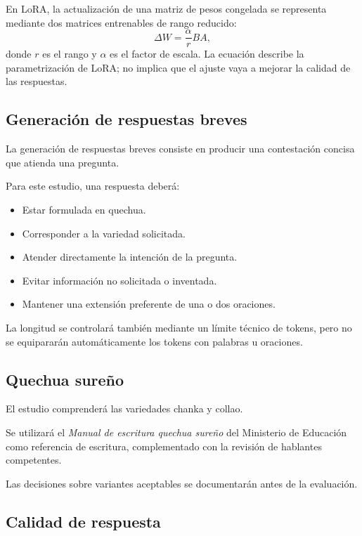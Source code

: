 En LoRA, la actualización de una matriz de pesos congelada se representa mediante dos matrices entrenables de rango reducido:
\begin{equation}
\Delta W=\frac{\alpha}{r}BA,
\label{eq:descomposicion_lora}
\end{equation}
donde $r$ es el rango y $\alpha$ es el factor de escala. La ecuación describe la parametrización de LoRA; no implica que el ajuste vaya a mejorar la calidad de las respuestas.

\subsection{Generación de respuestas breves}\label{generaciuxf3n-de-respuestas-breves}

La generación de respuestas breves consiste en producir una contestación concisa que atienda una pregunta.

Para este estudio, una respuesta deberá:

\begin{itemize}
\tightlist
\item
  Estar formulada en quechua.
\item
  Corresponder a la variedad solicitada.
\item
  Atender directamente la intención de la pregunta.
\item
  Evitar información no solicitada o inventada.
\item
  Mantener una extensión preferente de una o dos oraciones.
\end{itemize}

La longitud se controlará también mediante un límite técnico de tokens, pero no se equipararán automáticamente los tokens con palabras u oraciones.

\subsection{Quechua sureño}\label{quechua-sureuxf1o}

El estudio comprenderá las variedades chanka y collao.

Se utilizará el \emph{Manual de escritura quechua sureño} del Ministerio de Educación como referencia de escritura, complementado con la revisión de hablantes competentes.

Las decisiones sobre variantes aceptables se documentarán antes de la evaluación.

\subsection{Calidad de respuesta}\label{calidad-de-respuesta}

